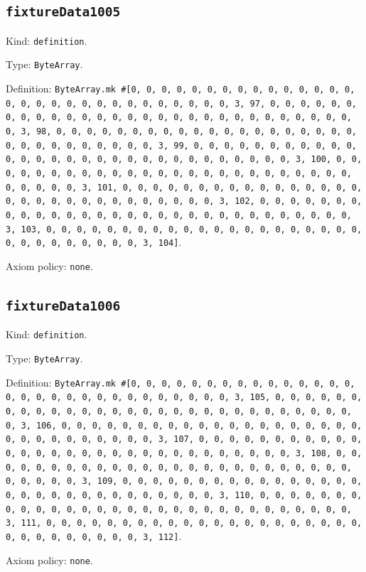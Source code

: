 \documentclass[11pt]{article}
\begin{document}
\subsection*{\texttt{fixtureData1005}}
\noindent Kind: \texttt{definition}.\par
\noindent Type: \texttt{ByteArray}.\par
\noindent Definition: \texttt{ByteArray.mk \#[0, 0, 0, 0, 0, 0, 0, 0, 0, 0, 0, 0, 0, 0, 0, 0, 0, 0, 0, 0, 0, 0, 0, 0, 0, 0, 0, 0, 0, 0, 3, 97, 0, 0, 0, 0, 0, 0, 0, 0, 0, 0, 0, 0, 0, 0, 0, 0, 0, 0, 0, 0, 0, 0, 0, 0, 0, 0, 0, 0, 0, 0, 3, 98, 0, 0, 0, 0, 0, 0, 0, 0, 0, 0, 0, 0, 0, 0, 0, 0, 0, 0, 0, 0, 0, 0, 0, 0, 0, 0, 0, 0, 0, 0, 3, 99, 0, 0, 0, 0, 0, 0, 0, 0, 0, 0, 0, 0, 0, 0, 0, 0, 0, 0, 0, 0, 0, 0, 0, 0, 0, 0, 0, 0, 0, 0, 3, 100, 0, 0, 0, 0, 0, 0, 0, 0, 0, 0, 0, 0, 0, 0, 0, 0, 0, 0, 0, 0, 0, 0, 0, 0, 0, 0, 0, 0, 0, 0, 3, 101, 0, 0, 0, 0, 0, 0, 0, 0, 0, 0, 0, 0, 0, 0, 0, 0, 0, 0, 0, 0, 0, 0, 0, 0, 0, 0, 0, 0, 0, 0, 3, 102, 0, 0, 0, 0, 0, 0, 0, 0, 0, 0, 0, 0, 0, 0, 0, 0, 0, 0, 0, 0, 0, 0, 0, 0, 0, 0, 0, 0, 0, 0, 3, 103, 0, 0, 0, 0, 0, 0, 0, 0, 0, 0, 0, 0, 0, 0, 0, 0, 0, 0, 0, 0, 0, 0, 0, 0, 0, 0, 0, 0, 0, 0, 3, 104]}.\par
\noindent Axiom policy: \texttt{none}.\par
\subsection*{\texttt{fixtureData1006}}
\noindent Kind: \texttt{definition}.\par
\noindent Type: \texttt{ByteArray}.\par
\noindent Definition: \texttt{ByteArray.mk \#[0, 0, 0, 0, 0, 0, 0, 0, 0, 0, 0, 0, 0, 0, 0, 0, 0, 0, 0, 0, 0, 0, 0, 0, 0, 0, 0, 0, 0, 0, 3, 105, 0, 0, 0, 0, 0, 0, 0, 0, 0, 0, 0, 0, 0, 0, 0, 0, 0, 0, 0, 0, 0, 0, 0, 0, 0, 0, 0, 0, 0, 0, 3, 106, 0, 0, 0, 0, 0, 0, 0, 0, 0, 0, 0, 0, 0, 0, 0, 0, 0, 0, 0, 0, 0, 0, 0, 0, 0, 0, 0, 0, 0, 0, 3, 107, 0, 0, 0, 0, 0, 0, 0, 0, 0, 0, 0, 0, 0, 0, 0, 0, 0, 0, 0, 0, 0, 0, 0, 0, 0, 0, 0, 0, 0, 0, 3, 108, 0, 0, 0, 0, 0, 0, 0, 0, 0, 0, 0, 0, 0, 0, 0, 0, 0, 0, 0, 0, 0, 0, 0, 0, 0, 0, 0, 0, 0, 0, 3, 109, 0, 0, 0, 0, 0, 0, 0, 0, 0, 0, 0, 0, 0, 0, 0, 0, 0, 0, 0, 0, 0, 0, 0, 0, 0, 0, 0, 0, 0, 0, 3, 110, 0, 0, 0, 0, 0, 0, 0, 0, 0, 0, 0, 0, 0, 0, 0, 0, 0, 0, 0, 0, 0, 0, 0, 0, 0, 0, 0, 0, 0, 0, 3, 111, 0, 0, 0, 0, 0, 0, 0, 0, 0, 0, 0, 0, 0, 0, 0, 0, 0, 0, 0, 0, 0, 0, 0, 0, 0, 0, 0, 0, 0, 0, 3, 112]}.\par
\noindent Axiom policy: \texttt{none}.\par
\end{document}
